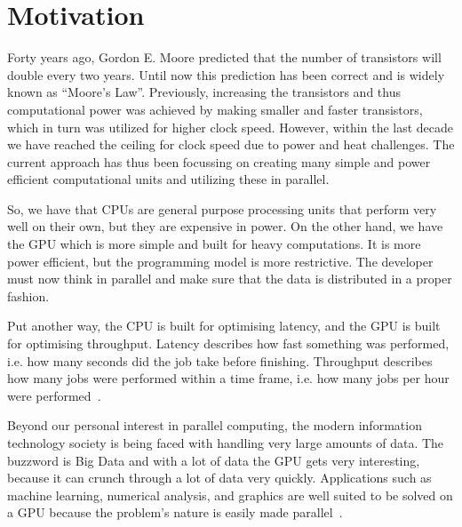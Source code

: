 \section{Motivation}
\label{sec:motivation}

Forty years ago, Gordon E. Moore predicted that the number of transistors will double every two years. Until now this prediction has been correct and is widely known as ``Moore's Law''. Previously, increasing the transistors and thus computational power was achieved by making smaller and faster transistors, which in turn was utilized for higher clock speed. However, within the last decade we have reached the ceiling for clock speed due to power and heat challenges. The current approach has thus been focussing on creating many simple and power efficient computational units and utilizing these in parallel.~\cite{udacity, schaller1997moore,bryant2003computer}

So, we have that CPUs are general purpose processing units that perform very well on their own, but they are expensive in power.
On the other hand, we have the GPU which is more simple and built for heavy computations.
It is more power efficient, but the programming model is more restrictive.
The developer must now think in parallel and make sure that the data is distributed in a proper fashion.

Put another way, the CPU is built for optimising latency, and the GPU is built for optimising throughput.
Latency describes how fast something was performed, i.e. how many seconds did the job take before finishing.
Throughput describes how many jobs were performed within a time frame, i.e. how many jobs per hour were performed~\cite{farber2011cuda}.

Beyond our personal interest in parallel computing, the modern information technology society is being faced with handling very large amounts of data.
The buzzword is Big Data and with a lot of data the GPU gets very interesting, because it can crunch through a lot of data very quickly.
Applications such as machine learning, numerical analysis, and graphics are well suited to be solved on a GPU because the problem's nature is easily made parallel~\cite{amdahlorgustafson2011,chen2014data}.
